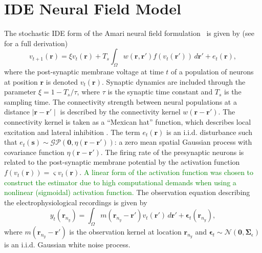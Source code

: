 \documentclass[journal]{IEEEtran}
\newcommand{\dean}[1]{\textcolor{green}{#1}}
\newcommand{\ken}[1]{\textsf{\emph{\textbf{\textcolor{magenta}{#1}}}}}
\begin{document}
\section{IDE Neural Field Model}
The stochastic IDE form of the Amari neural field  formulation~\cite{Amari1977} is given by (see~\cite{Freestone2011} for a full derivation)
\begin{equation}\label{eq:DiscreteTimeModel}
	v_{t+1}\left(\mathbf{r}\right) = 
	\xi v_t\left(\mathbf{r}\right) + 
	T_s \int_\Omega { 
	    w\left(\mathbf{r},\mathbf{r'}\right)
	    f\left(v_t\left(\mathbf{r}'\right)\right) 
	\, d\mathbf{r}'} 
	+ e_t\left(\mathbf{r}\right), 
\end{equation}
where the post-synaptic membrane voltage at time $t$ of a population of neurons at position $\mathbf r$ is denoted $v_t\left(\mathbf r\right)$. Synaptic dynamics are included through the parameter $\xi=1-T_s/\tau$, where $\tau$ is the synaptic time constant and $T_s$ is the sampling time. The connectivity strength between neural populations at a distance $\mid\mathbf{r}-\mathbf{r'}\mid$ is described by the connectivity kernel $w\left(\mathbf{r}-\mathbf{r}'\right)$. The connectivity kernel is taken as a ``Mexican hat'' function, which describes local excitation and lateral inhibition \cite{Amari1977}. The term $e_t(\mathbf r)$ is an i.i.d. disturbance such that $e_t(\mathbf{s})\sim\mathcal{GP}(\mathbf 0,\eta(\mathbf{r}-\mathbf{r'}))$: a zero mean spatial Gaussian process with covariance function $\eta(\mathbf{r}-\mathbf{r'})$. The firing rate of the presynaptic neurons is related to the post-synaptic membrane potential by the activation function $f(v_t(\mathbf{r})) = \varsigma v_t(\mathbf{r})$. \dean{A linear form of the activation function was chosen to construct the estimator due to high computational demands when using a nonlinear (sigmoidal) activation function. }
The observation equation describing the electrophysiological recordings is given by
\begin{equation}\label{eq:ObservationEquation}
	y_t(\mathbf{r}_{n_y}) = \int_{\Omega} { m\left(\mathbf{r}_{n_y}-\mathbf{r}'\right) v_t\left(\mathbf{r}'\right) \, d\mathbf{r}'} + \boldsymbol\epsilon_t(\mathbf{r}_{n_y}), 
\end{equation}
where $m\left(\mathbf{r}_{n_y}-\mathbf{r}'\right)$ is the observation kernel at location $\mathbf{r}_{n_y}$ and  $\boldsymbol{\epsilon}_{t}\sim \mathcal{N}\left(\mathbf{0},\mathbf{\Sigma}_{\epsilon}\right)$  is an i.i.d. Gaussian white noise process. %
\end{document}
